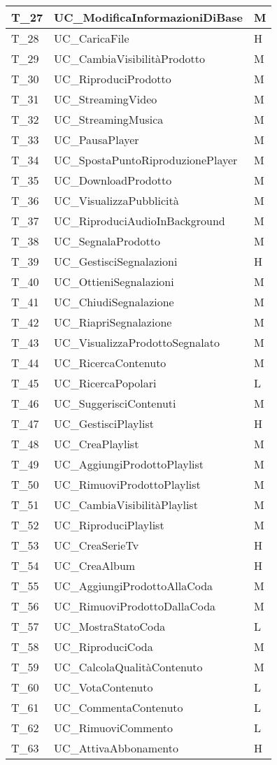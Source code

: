 \begin{longtable}{| p{} | p{} | p{} |}
    T\_27 & UC\_ModificaInformazioniDiBase & M\\\hline
    T\_28 & UC\_CaricaFile & H\\\hline
    T\_29 & UC\_CambiaVisibilitàProdotto & M\\\hline
    T\_30 & UC\_RiproduciProdotto & M\\\hline
    T\_31 & UC\_StreamingVideo & M\\\hline
    T\_32 & UC\_StreamingMusica & M\\\hline
    T\_33 & UC\_PausaPlayer & M\\\hline
    T\_34 & UC\_SpostaPuntoRiproduzionePlayer & M\\\hline
    T\_35 & UC\_DownloadProdotto & M\\\hline
    T\_36 & UC\_VisualizzaPubblicità & M\\\hline
    T\_37 & UC\_RiproduciAudioInBackground & M\\\hline
    T\_38 & UC\_SegnalaProdotto & M\\\hline
    T\_39 & UC\_GestisciSegnalazioni & H\\\hline
    T\_40 & UC\_OttieniSegnalazioni & M\\\hline
    T\_41 & UC\_ChiudiSegnalazione & M\\\hline
    T\_42 & UC\_RiapriSegnalazione & M\\\hline
    T\_43 & UC\_VisualizzaProdottoSegnalato & M\\\hline
    T\_44 & UC\_RicercaContenuto & M\\\hline
    T\_45 & UC\_RicercaPopolari & L\\\hline
    T\_46 & UC\_SuggerisciContenuti & M\\\hline
    T\_47 & UC\_GestisciPlaylist & H\\\hline
    T\_48 & UC\_CreaPlaylist & M\\\hline
    T\_49 & UC\_AggiungiProdottoPlaylist & M\\\hline
    T\_50 & UC\_RimuoviProdottoPlaylist & M\\\hline
    T\_51 & UC\_CambiaVisibilitàPlaylist & M\\\hline
    T\_52 & UC\_RiproduciPlaylist & M\\\hline
    T\_53 & UC\_CreaSerieTv & H\\\hline
    T\_54 & UC\_CreaAlbum & H\\\hline
    T\_55 & UC\_AggiungiProdottoAllaCoda & M\\\hline
    T\_56 & UC\_RimuoviProdottoDallaCoda & M\\\hline
    T\_57 & UC\_MostraStatoCoda & L\\\hline
    T\_58 & UC\_RiproduciCoda & M\\\hline
    T\_59 & UC\_CalcolaQualitàContenuto & M\\\hline
    T\_60 & UC\_VotaContenuto & L\\\hline
    T\_61 & UC\_CommentaContenuto & L\\\hline
    T\_62 & UC\_RimuoviCommento & L\\\hline
    T\_63 & UC\_AttivaAbbonamento & H\\\hline
 \end{longtable}

